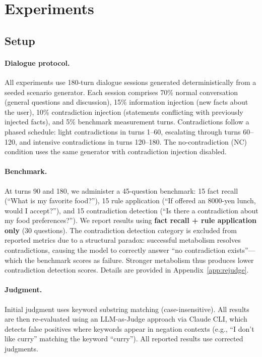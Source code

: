 \documentclass[11pt,a4paper]{article}
\begin{document}
\section{Experiments}
\label{sec:experiments}

\subsection{Setup}
\label{sec:setup}

\paragraph{Dialogue protocol.}
All experiments use 180-turn dialogue sessions generated deterministically from a seeded scenario generator.
Each session comprises 70\% normal conversation (general questions and discussion), 15\% information injection (new facts about the user), 10\% contradiction injection (statements conflicting with previously injected facts), and 5\% benchmark measurement turns.
Contradictions follow a phased schedule: light contradictions in turns 1--60, escalating through turns 60--120, and intensive contradictions in turns 120--180.
The no-contradiction (NC) condition uses the same generator with contradiction injection disabled.

\paragraph{Benchmark.}
At turns 90 and 180, we administer a 45-question benchmark: 15 fact recall (``What is my favorite food?''), 15 rule application (``If offered an 8000-yen lunch, would I accept?''), and 15 contradiction detection (``Is there a contradiction about my food preferences?'').
We report results using \textbf{fact recall + rule application only} (30 questions).
The contradiction detection category is excluded from reported metrics due to a structural paradox: successful metabolism resolves contradictions, causing the model to correctly answer ``no contradiction exists''---which the benchmark scores as failure.
Stronger metabolism thus produces lower contradiction detection scores.
Details are provided in Appendix~\ref{app:rejudge}.

\paragraph{Judgment.}
Initial judgment uses keyword substring matching (case-insensitive).
All results are then re-evaluated using an LLM-as-Judge approach via Claude CLI, which detects false positives where keywords appear in negation contexts (e.g., ``I don't like curry'' matching the keyword ``curry'').
All reported results use corrected judgments.
\end{document}
